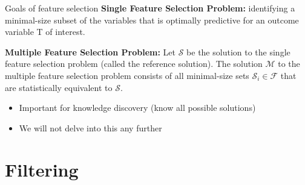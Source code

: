 \documentclass[11pt,compress,t,notes=noshow, aspectratio=169, xcolor=table]{beamer}
\begin{document}
\begin{frame}{Goals of feature selection}
\vfill
\textbf{Single Feature Selection Problem:} identifying a minimal-size subset of the variables that is optimally predictive for an outcome variable T of interest.

\vfill

\textbf{Multiple Feature Selection Problem:} Let $\mathcal{S}$ be the solution to the single feature selection problem (called the reference solution). The solution $\mathcal{M}$ to the multiple feature selection problem consists of all minimal-size sets $\mathcal{S}_i \in \mathcal{F}$  that are statistically equivalent to $\mathcal{S}$.
\begin{itemize}
    \item Important for knowledge discovery (know all possible solutions)
    \item We will not delve into this any further
\end{itemize}
\vfill
\end{frame}

\begin{frame}{}

\end{frame}

\section{Filtering}

\begin{frame}{}
 
\end{frame}

\begin{frame}{}
 
\end{frame}

\begin{frame}{}
 
\end{frame}
\end{document}
